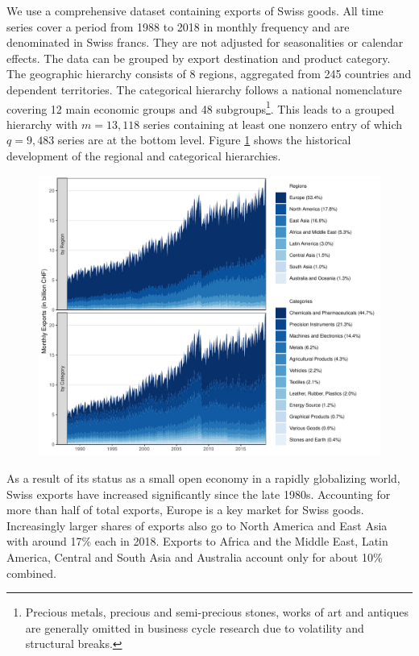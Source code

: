 \documentclass[a4paper,fleqn,11pt]{article}
\begin{document}
We use a comprehensive dataset containing exports of Swiss goods. All time series cover a period from 1988 to 2018 in monthly frequency and are denominated in Swiss francs. They are not adjusted for seasonalities or calendar effects. The data can be grouped by export destination and product category. The geographic hierarchy consists of 8 regions, aggregated from 245 countries and dependent territories. The categorical hierarchy follows a national nomenclature covering 12 main economic groups and 48 subgroups\footnote{Precious metals, precious and semi-precious stones, works of art and antiques are generally omitted in business cycle research due to volatility and structural breaks.}. This leads to a grouped hierarchy with $m = 13,118$ series containing at least one nonzero entry of which $q = 9,483$ series are at the bottom level. Figure \ref{fig:area} shows the historical development of the regional and categorical hierarchies.

\begin{figure}[H]
	\includegraphics[width=\textwidth]{fig/fig_area}
	\label{fig:area}
\end{figure}

As a result of its status as a small open economy in a rapidly globalizing world, Swiss exports have increased significantly since the late 1980s. Accounting for more than half of total exports, Europe is a key market for Swiss goods. Increasingly larger shares of exports also go to North America and East Asia with around 17\% each in 2018. Exports to Africa and the Middle East, Latin America, Central and South Asia and Australia account only for about 10\% combined.
\end{document}
